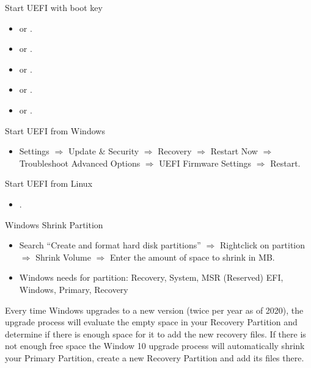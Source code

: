 \begin{frame}[fragile]{Start UEFI with boot key}
  \begin{itemize}
    \item {}  or .
    \item {}  or .
    \item {}  or .
    \item {}  or .
    \item {}  or .
  \end{itemize}
\end{frame}

\begin{frame}{Start UEFI from Windows}
  \begin{itemize}
    \item Settings $\Rightarrow$ Update \& Security $\Rightarrow$ Recovery $\Rightarrow$ Restart Now $\Rightarrow$ Troubleshoot Advanced Options $\Rightarrow$ UEFI Firmware Settings $\Rightarrow$ Restart.
  \end{itemize}
\end{frame}
%
\begin{frame}[fragile]{Start UEFI from Linux}
  \begin{itemize}
    \item {}.
  \end{itemize}
\end{frame}

\begin{frame}{Windows Shrink Partition}
  \begin{itemize}
    \item Search \enquote{Create and format hard disk partitions} $\Rightarrow$ Rightclick on partition $\Rightarrow$ Shrink Volume $\Rightarrow$ Enter the amount of space to shrink in MB.
    \item Windows needs for partition: Recovery, System, MSR (Reserved) EFI, Windows, Primary, Recovery
  \end{itemize}
  \begin{Sidenote}
     Every time Windows upgrades to a new version (twice per year as of 2020), the upgrade process will evaluate the empty space in your Recovery Partition and determine if there is enough space for it to add the new recovery files.  If there is not enough free space the Window 10 upgrade process will automatically shrink your Primary Partition, create a new Recovery Partition and add its files there.
  \end{Sidenote}
\end{frame}

